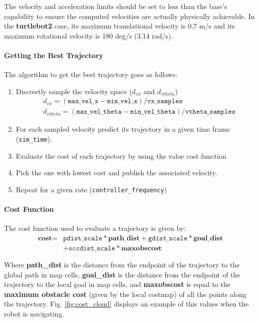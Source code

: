 \documentclass[12pt]{article}
\begin{document}
The velocity and acceleration limits should be set to less than the base's capability to ensure the computed velocities are actually physically achievable. In the \textbf{turtlebot2} case, its maximum  translational velocity is 0.7 m/s and its maximum rotational velocity is 180 deg/s (3.14 rad/s).

\paragraph{Getting the Best Trajectory}
The algorithm to get the best trajectory goes as follows:
\begin{enumerate}
    \item Discreetly sample the velocity space ($d_{vx}$ and $d_{vtheta}$)
    \begin{align*}
        & d_{vx}=(\texttt{max\_vel\_x}-\texttt{min\_vel\_x})/\texttt{vx\_samples}\\
         & d_{vtheta}=(\texttt{max\_vel\_theta}-\texttt{min\_vel\_theta})/\texttt{vtheta\_samples}
    \end{align*}
    \item For each sampled velocity predict its trajectory in a given time frame (\texttt{sim\_time}).
    \item Evaluate the cost of each trajectory  by using the value cost function
    \item Pick the one with lowest cost and publish the associated velocity.
    \item Repeat for a given rate (\texttt{controller\_frequency})
\end{enumerate}

\paragraph{Cost Function}
The cost function used to evaluate a trajectory is given by:
\begin{align*}
        \textbf{cost} = &
   \texttt{pdist\_scale} * \textbf{path\_dist}
   + \texttt{gdist\_scale} * \textbf{goal\_dist}\\
   &+\texttt{occdist\_scale} * \textbf{maxobscost} 
\end{align*}

Where \textbf{path\_dist} is the distance from the endpoint of the trajectory to the global path in map cells, \textbf{goal\_dist} is the distance from the endpoint of the trajectory to the local goal in map cells, and \textbf{maxobscost} is equal to the \textbf{maximum obstacle cost} (given by the local costmap) of all the points along the trajectory.
Fig. \ref{fig:cost_cloud} displays an example of this values when the robot is navigating.
\end{document}
